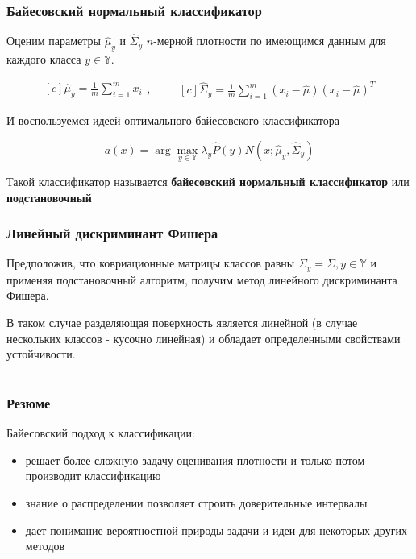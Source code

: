 \documentclass{beamer}
\begin{document}
	\begin{frame}
		\frametitle{Байесовский нормальный классификатор}
		Оценим параметры $\hat{\mu}_y$ и $\hat{\Sigma}_y$ $n$-мерной плотности  по имеющимся данным для каждого класса $y \in \mathbb{Y}$.
		
		\begin{equation*}
			\begin{aligned}[c]
				\hat{\mu}_y = \frac{1}{m} \sum_{i=1}^{m} x_i
			\end{aligned}
			,\qquad
			\begin{aligned}[c]
				\hat{\Sigma}_y = \frac{1}{m} \sum_{i=1}^{m} (x_i - \hat{\mu})(x_i - \hat{\mu})^T
			\end{aligned}
		\end{equation*}
		
		\vspace{5pt}
		
		И воспользуемся идеей оптимального байесовского классификатора
		
		\[
		a(x) = \arg \max_{y \in \mathbb{Y}} \lambda_{y} \hat{P}(y) N(x; \hat{\mu}_y, \hat{\Sigma}_y)
		\]
		
		Такой классификатор называется \textbf{байесовский нормальный классификатор} или \textbf{подстановочный}
	\end{frame}
	
	\begin{frame}
		\frametitle{Линейный дискриминант Фишера}
		Предположив, что ковриационные матрицы классов равны $\Sigma_y = \Sigma, y \in \mathbb{Y}$ и применяя подстановочный алгоритм, получим метод линейного дискриминанта Фишера.
		
		\vspace{15pt}
		
		В таком случае разделяющая поверхность является линейной (в случае нескольких классов - кусочно линейная) и обладает определенными свойствами устойчивости.
	\end{frame}
	
	\section{}
	
	\begin{frame}
		\frametitle{Резюме}
		Байесовский подход к классификации:
		\begin{itemize}
			\item решает более сложную задачу оценивания плотности и только потом производит классификацию
			 \item знание о распределении позволяет строить доверительные интервалы
			 \item  дает понимание вероятностной природы задачи и идеи для некоторых других методов
		\end{itemize}
	\end{frame}
\end{document}
